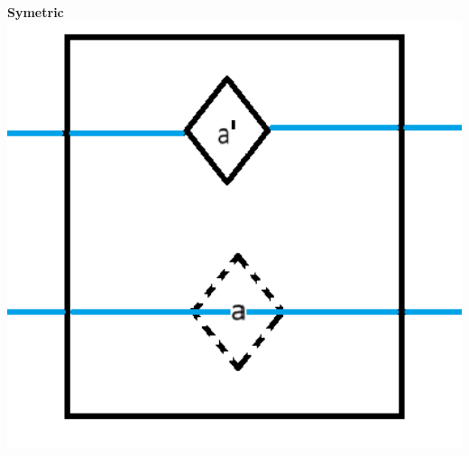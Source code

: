 \documentclass{beamer}
\begin{document}
\begin{frame}
\begin{minipage}[b]{0.32\textwidth}
  \end{minipage}
  \begin{minipage}[b]{0.32\textwidth}
    \textbf{Symetric}
    \includegraphics[width=1\textwidth]{res/doors/SelfClosingSymetricDoor.png}
  \end{minipage}
\end{frame}
\end{document}
